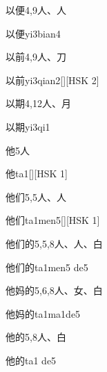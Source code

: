 \begin{entry}{以便}{4,9}{⼈、⼈}
  \begin{phonetics}{以便}{yi3bian4}
  \end{phonetics}
\end{entry}

\begin{entry}{以前}{4,9}{⼈、⼑}
  \begin{phonetics}{以前}{yi3qian2}[][HSK 2]
  \end{phonetics}
\end{entry}

\begin{entry}{以期}{4,12}{⼈、⽉}
  \begin{phonetics}{以期}{yi3qi1}
  \end{phonetics}
\end{entry}

\begin{entry}{他}{5}{⼈}
  \begin{phonetics}{他}{ta1}[][HSK 1]
  \end{phonetics}
\end{entry}

\begin{entry}{他们}{5,5}{⼈、⼈}
  \begin{phonetics}{他们}{ta1men5}[][HSK 1]
  \end{phonetics}
\end{entry}

\begin{entry}{他们的}{5,5,8}{⼈、⼈、⽩}
  \begin{phonetics}{他们的}{ta1men5 de5}
  \end{phonetics}
\end{entry}

\begin{entry}{他妈的}{5,6,8}{⼈、⼥、⽩}
  \begin{phonetics}{他妈的}{ta1ma1de5}
  \end{phonetics}
\end{entry}

\begin{entry}{他的}{5,8}{⼈、⽩}
  \begin{phonetics}{他的}{ta1 de5}
  \end{phonetics}
\end{entry}

